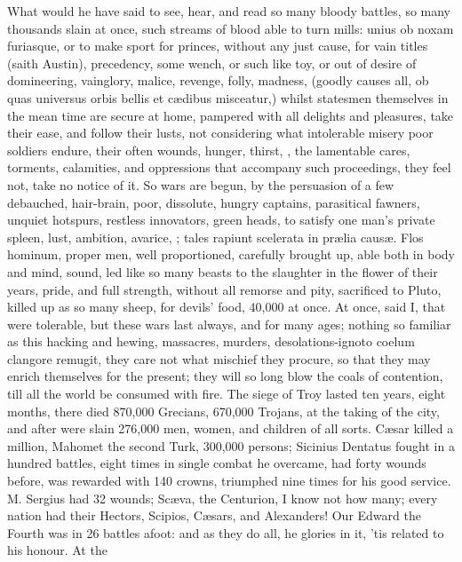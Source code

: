 {What would he have said to see, hear, and read so many bloody battles,
so many thousands slain at once, such streams of blood able to turn
mills: unius ob noxam furiasque, or to make sport for princes, without
any just cause, for vain titles (saith Austin), precedency, some
wench, or such like toy, or out of desire of domineering, vainglory,
malice, revenge, folly, madness, (goodly causes all, ob quas universus
orbis bellis et c\ae{}dibus misceatur,) whilst statesmen themselves in the
mean time are secure at home, pampered with all delights and pleasures,
take their ease, and follow their lusts, not considering what
intolerable misery poor soldiers endure, their often wounds, hunger,
thirst, \etc{}, the lamentable cares, torments, calamities, and
oppressions that accompany such proceedings, they feel not, take no
notice of it. So wars are begun, by the persuasion of a few debauched,
hair-brain, poor, dissolute, hungry captains, parasitical fawners,
unquiet hotspurs, restless innovators, green heads, to satisfy one
man's private spleen, lust, ambition, avarice, \etc{}; tales rapiunt
scelerata in pr\ae{}lia caus\ae{}. Flos hominum, proper men, well
proportioned, carefully brought up, able both in body and mind, sound,
led like so many beasts to the slaughter in the flower of their
years, pride, and full strength, without all remorse and pity,
sacrificed to Pluto, killed up as so many sheep, for devils' food,
40,000 at once. At once, said I, that were tolerable, but these wars
last always, and for many ages; nothing so familiar as this hacking and
hewing, massacres, murders, desolations-ignoto coelum clangore remugit,
they care not what mischief they procure, so that they may enrich
themselves for the present; they will so long blow the coals of
contention, till all the world be consumed with fire. The siege of
Troy lasted ten years, eight months, there died 870,000 Grecians,
670,000 Trojans, at the taking of the city, and after were slain
276,000 men, women, and children of all sorts. C\ae{}sar killed a million,
Mahomet the second Turk, 300,000 persons; Sicinius Dentatus fought
in a hundred battles, eight times in single combat he overcame, had
forty wounds before, was rewarded with 140 crowns, triumphed nine times
for his good service. M. Sergius had 32 wounds; Sc\ae{}va, the Centurion,
I know not how many; every nation had their Hectors, Scipios, C\ae{}sars,
and Alexanders! Our Edward the Fourth was in 26 battles afoot: and
as they do all, he glories in it, 'tis related to his honour. At the
}
